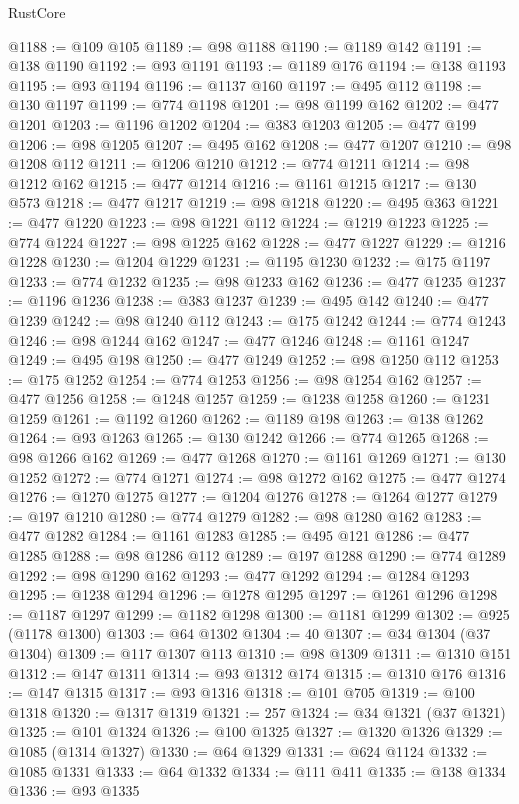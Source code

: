 \begin{lexlean}{RustCore}
\begin{coremodule}
@1188 := @109 @105
@1189 := @98 @1188
@1190 := @1189 @142
@1191 := @138 @1190
@1192 := @93 @1191
@1193 := @1189 @176
@1194 := @138 @1193
@1195 := @93 @1194
@1196 := @1137 @160
@1197 := @495 @112
@1198 := @130 @1197
@1199 := @774 @1198
@1201 := @98 @1199 @162
@1202 := @477 @1201
@1203 := @1196 @1202
@1204 := @383 @1203
@1205 := @477 @199
@1206 := @98 @1205
@1207 := @495 @162
@1208 := @477 @1207
@1210 := @98 @1208 @112
@1211 := @1206 @1210
@1212 := @774 @1211
@1214 := @98 @1212 @162
@1215 := @477 @1214
@1216 := @1161 @1215
@1217 := @130 @573
@1218 := @477 @1217
@1219 := @98 @1218
@1220 := @495 @363
@1221 := @477 @1220
@1223 := @98 @1221 @112
@1224 := @1219 @1223
@1225 := @774 @1224
@1227 := @98 @1225 @162
@1228 := @477 @1227
@1229 := @1216 @1228
@1230 := @1204 @1229
@1231 := @1195 @1230
@1232 := @175 @1197
@1233 := @774 @1232
@1235 := @98 @1233 @162
@1236 := @477 @1235
@1237 := @1196 @1236
@1238 := @383 @1237
@1239 := @495 @142
@1240 := @477 @1239
@1242 := @98 @1240 @112
@1243 := @175 @1242
@1244 := @774 @1243
@1246 := @98 @1244 @162
@1247 := @477 @1246
@1248 := @1161 @1247
@1249 := @495 @198
@1250 := @477 @1249
@1252 := @98 @1250 @112
@1253 := @175 @1252
@1254 := @774 @1253
@1256 := @98 @1254 @162
@1257 := @477 @1256
@1258 := @1248 @1257
@1259 := @1238 @1258
@1260 := @1231 @1259
@1261 := @1192 @1260
@1262 := @1189 @198
@1263 := @138 @1262
@1264 := @93 @1263
@1265 := @130 @1242
@1266 := @774 @1265
@1268 := @98 @1266 @162
@1269 := @477 @1268
@1270 := @1161 @1269
@1271 := @130 @1252
@1272 := @774 @1271
@1274 := @98 @1272 @162
@1275 := @477 @1274
@1276 := @1270 @1275
@1277 := @1204 @1276
@1278 := @1264 @1277
@1279 := @197 @1210
@1280 := @774 @1279
@1282 := @98 @1280 @162
@1283 := @477 @1282
@1284 := @1161 @1283
@1285 := @495 @121
@1286 := @477 @1285
@1288 := @98 @1286 @112
@1289 := @197 @1288
@1290 := @774 @1289
@1292 := @98 @1290 @162
@1293 := @477 @1292
@1294 := @1284 @1293
@1295 := @1238 @1294
@1296 := @1278 @1295
@1297 := @1261 @1296
@1298 := @1187 @1297
@1299 := @1182 @1298
@1300 := @1181 @1299
@1302 := @925 (@1178 @1300)
@1303 := @64 @1302
@1304 := 40
@1307 := @34 @1304 (@37 @1304)
@1309 := @117 @1307 @113
@1310 := @98 @1309
@1311 := @1310 @151
@1312 := @147 @1311
@1314 := @93 @1312 @174
@1315 := @1310 @176
@1316 := @147 @1315
@1317 := @93 @1316
@1318 := @101 @705
@1319 := @100 @1318
@1320 := @1317 @1319
@1321 := 257
@1324 := @34 @1321 (@37 @1321)
@1325 := @101 @1324
@1326 := @100 @1325
@1327 := @1320 @1326
@1329 := @1085 (@1314 @1327)
@1330 := @64 @1329
@1331 := @624 @1124
@1332 := @1085 @1331
@1333 := @64 @1332
@1334 := @111 @411
@1335 := @138 @1334
@1336 := @93 @1335

\end{coremodule}
\end{lexlean}
